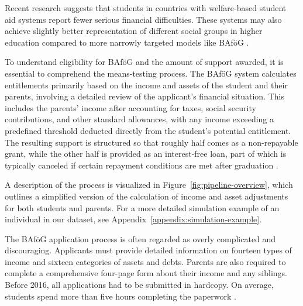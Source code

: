 Recent research suggests that students in countries with welfare-based student aid systems report fewer serious financial difficulties. These systems may also achieve slightly better representation of different social groups in higher education compared to more narrowly targeted models like BAföG  \citep{gwosc_krisenbewaltigung_2022}.



To understand eligibility for BAföG and the amount of support awarded, it is essential to comprehend the means-testing process. The BAföG system calculates entitlements primarily based on the income and assets of the student and their parents, involving a detailed review of the applicant’s financial situation. This includes the parents’ income after accounting for taxes, social security contributions, and other standard allowances, with any income exceeding a predefined threshold deducted directly from the student’s potential entitlement. The resulting support is structured so that roughly half comes as a non-repayable grant, while the other half is provided as an interest-free loan, part of which is typically canceled if certain repayment conditions are met after graduation \citep{herber_non-take-up_2019}.

A description of the process is visualized in Figure~\ref{fig:pipeline-overview}, which outlines a simplified version of the calculation of income and asset adjustments for both students and parents. For a more detailed simulation example of an individual in our dataset, see Appendix~\ref{appendix:simulation-example}.

The BAföG application process is often regarded as overly complicated and discouraging. Applicants must provide detailed information on fourteen types of income and sixteen categories of assets and debts. Parents are also required to complete a comprehensive four-page form about their income and any siblings. Before 2016, all applications had to be submitted in hardcopy. On average, students spend more than five hours completing the paperwork \citep{fidan_why_2021}.

